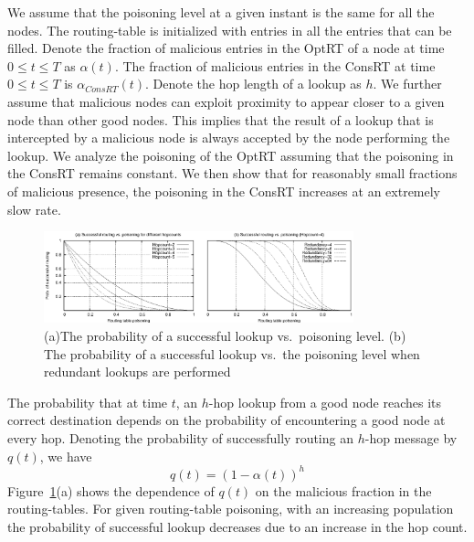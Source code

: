 \documentclass[10pt,twocolumn]{article}
\newcommand{\PRT}{OptRT\xspace}
\newcommand{\CRT}{ConsRT\xspace}
\begin{document}
We assume that the poisoning level at a given instant is the same for all the
nodes. The routing-table is initialized with entries in all the entries that can be filled. Denote the fraction of malicious
entries in the \PRT of a node at time $0\le t \le T$ as $\alpha(t)$. The
fraction of malicious entries in the \CRT at time $0\le t\le T$ is
$\alpha_{\CRT}(t)$. Denote the hop length of a lookup as $h$. We further assume
that malicious nodes can exploit proximity to appear closer to a given node than
other good nodes. This implies that the result of a lookup that is intercepted by a malicious node is always accepted by the node performing the lookup. We analyze the poisoning of the \PRT assuming that the poisoning in the \CRT remains constant. We then show that for reasonably small fractions of malicious presence, the poisoning in the \CRT increases at an extremely slow rate.
\begin{figure}
\centerline{\includegraphics[width=0.8\textwidth]{graphs/equations/successful-routing}}
\caption{(a)The probability of a successful lookup vs.\ poisoning level. (b) The probability of a successful lookup vs.\ the poisoning level when redundant lookups are performed }
\label{fig:successful-routing}
\end{figure}


The probability that at time $t$, an $h$-hop lookup from a good node reaches its
correct destination depends on the probability of encountering a good node at every hop. Denoting the probability of successfully routing an $h$-hop message by $q(t)$, we have 
\begin{equation}
q(t)=(1-\alpha(t))^h
\label{eqn:successful}
\end{equation}
Figure~\ref{fig:successful-routing}(a) shows the dependence of $q(t)$ on
the malicious fraction in the routing-tables. For given routing-table poisoning, with an increasing population
the probability of successful lookup decreases due to an increase in the
hop count. 
\end{document}
